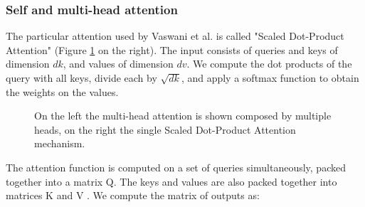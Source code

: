 \subsubsection{Self and multi-head attention}
The particular attention used by Vaswani et al. \cite{vaswani2017attention} is called "Scaled Dot-Product Attention" (Figure \ref{fig:transformer_attention} on the right). The input consists of queries and keys of dimension $dk$, and values of dimension $dv$. We compute the dot products of the query with all keys, divide each by $\sqrt{dk}$, and apply a softmax function to obtain the weights on the values.
\begin{figure}[H]%
    \centering
    \caption{On the left the multi-head attention is shown composed by multiple heads, on the right the single Scaled Dot-Product Attention mechanism.}
    \label{fig:transformer_attention}%
\end{figure}
The attention function is computed on a set of queries simultaneously, packed together into a matrix Q. The keys and values are also packed together into matrices K and V . We compute the matrix of outputs as:
